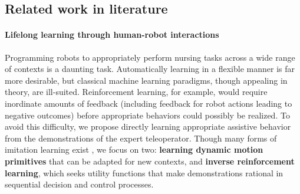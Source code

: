 \documentclass[letterpaper, 11 pt, onecolumn]{article}
\newcommand{\jie}[1]{\textcolor{green}{JF: #1}}
\begin{document}




\subsection{Related work in literature}\label{sec:related-liter}
\paragraph*{Lifelong learning through human-robot interactions}



Programming robots to appropriately perform nursing tasks across a wide range of
contexts is a daunting task.  Automatically learning in a flexible manner is far more desirable, but
classical machine learning paradigms, though appealing in theory,
are ill-suited.
Reinforcement learning, for example, would require inordinate amounts of
feedback (including feedback for robot actions leading to negative outcomes)
before appropriate behaviors could possibly be realized.
To avoid this difficulty, we propose directly learning appropriate
assistive behavior from the demonstrations of the expert teleoperator.
Though many forms of imitation learning exist \cite{argall2009survey}, we focus on two: {\bf learning dynamic motion primitives} that can be adapted for new contexts, and {\bf inverse reinforcement learning}, which seeks utility functions that make demonstrations rational in sequential decision and control processes.
\end{document}
